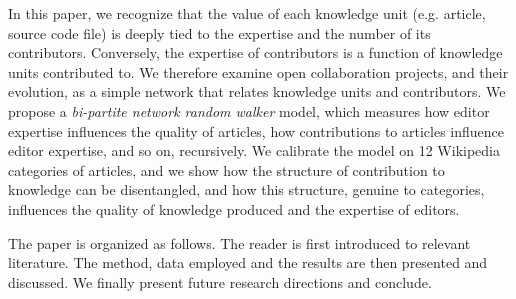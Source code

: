 In this paper, we recognize that the value of each knowledge unit (e.g. article, source code file) is deeply tied to the expertise and the number of its contributors. Conversely, the expertise of contributors is a function of knowledge units contributed to. We therefore examine open collaboration projects, and their evolution, as a simple network that relates knowledge units and contributors. We propose a {\it bi-partite network random walker} model, which measures how editor expertise influences the quality of articles, how contributions to articles influence editor expertise, and so on, recursively. We calibrate the model on 12 Wikipedia categories of articles, and we show how the structure of contribution to knowledge can be disentangled, and how this structure, genuine to categories, influences the quality of knowledge produced and the expertise of editors.

The paper is organized as follows. The reader is first introduced to relevant literature. The method, data employed and the results are then presented and discussed. We finally present future research directions and conclude.
